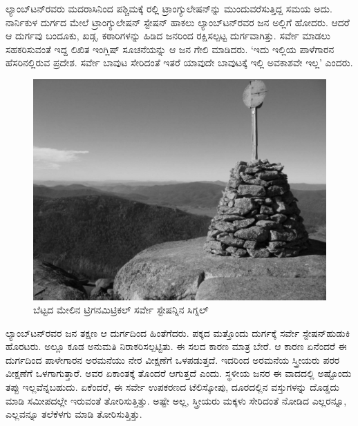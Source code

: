 \vskip 4pt

ಲ್ಯಾಂಬ್​ಟನ್​ರವರು ಮದರಾಸಿನಿಂದ ಪಶ್ಚಿಮಕ್ಕೆ ರಲ್ಲಿ ಟ್ರಾಂಗ್ಯುಲೇಷನ್​ನ್ನು ಮುಂದುವರೆಸುತ್ತಿದ್ದ ಸಮಯ ಅದು. ನಾರ್ನಿಕುಳ ದುರ್ಗದ ಮೇಲೆ ಟ್ರಾಂಗ್ಯುಲೇಷನ್​ ಸ್ಟೇಷನ್​ ಹಾಕಲು ಲ್ಯಾಂಬ್​ಟನ್​ರವರ ಜನ ಅಲ್ಲಿಗೆ ಹೋದರು. ಆದರೆ ಆ ದುರ್ಗವು ಬಂದೂಕು, ಖಡ್ಗ, ಕಠಾರಿಗಳನ್ನು ಹಿಡಿದ ಜನರಿಂದ ರಕ್ಷಿಸಲ್ಪಟ್ಟ ದುರ್ಗವಾಗಿತ್ತು. ಸರ್ವೇ ಮಾಡಲು ಸಹಕರಿಸುವಂತೆ ಇದ್ದ ಲಿಖಿತ ಇಂಗ್ಲಿಷ್​ ಸೂಚನೆಯನ್ನು ಆ ಜನ ಗೇಲಿ ಮಾಡಿದರು. ‘ಇದು ಇಲ್ಲಿಯ ಪಾಳೆಗಾರನ ಹೆಸರಿನಲ್ಲಿರುವ ಪ್ರದೇಶ. ಸರ್ವೇ ಬಾವುಟ ಸೇರಿದಂತೆ ಇತರೆ ಯಾವುದೇ ಬಾವುಟಕ್ಕೆ ಇಲ್ಲಿ ಅವಕಾಶವೇ ಇಲ್ಲ’ ಎಂದರು.

\begin{figure}[!htbp]
\includegraphics{"images/image016.jpg"}
\caption{ಬೆಟ್ಟದ ಮೇಲಿನ ಟ್ರಿಗನಮಿಟ್ರಿಕಲ್​ ಸರ್ವೇ ಸ್ಟೇಷನ್ನಿನ ಸಿಗ್ನಲ್​}\label{art12-fig1}
\end{figure}

\newpage

ಲ್ಯಾಂಬ್​ಟನ್​ರವರ ಜನ ತಕ್ಷಣ ಆ ದುರ್ಗದಿಂದ ಹಿಂತೆಗೆದರು. ಪಕ್ಕದ ಮತ್ತೊಂದು ದುರ್ಗಕ್ಕೆ ಸರ್ವೇ ಸ್ಟೇಷನ್​ ಹುಡುಕಿ ಹೊರಟರು. ಅಲ್ಲೂ ಕೂಡ ಅನುಮತಿ ನಿರಾಕರಿಸಲ್ಪಟ್ಟಿತು. ಈ ಸಲದ ಕಾರಣ ಮಾತ್ರ ಬೇರೆ. ಆ ಕಾರಣ ಏನೆಂದರೆ ಈ ದುರ್ಗದಿಂದ ಪಾಳೇಗಾರನ ಅರಮನೆಯು ನೇರ ವೀಕ್ಷಣೆಗೆ ಒಳಪಡುತ್ತದೆ. ಇದರಿಂದ ಅರಮನೆಯ ಸ್ತ್ರೀಯರು ಪರರ ವೀಕ್ಷಣೆಗೆ ಒಳಗಾಗುತ್ತಾರೆ. ಅವರ ಏಕಾಂತಕ್ಕೆ ತೊಂದರೆ ಆಗುತ್ತದೆ ಎಂದು. ಸ್ಥಳೀಯ ಜನರ ಈ ವಾದದಲ್ಲಿ ಅಷ್ಟೊಂದು ತಪ್ಪು ಇಲ್ಲವೆನ್ನಬಹುದು. ಏಕೆಂದರೆ, ಈ ಸರ್ವೇ ಉಪಕರಣದ ಟೆಲಿಸ್ಕೋಪು, ದೂರದಲ್ಲಿನ ವಸ್ತುಗಳನ್ನು ದೊಡ್ಡದು ಮಾಡಿ ಸಮೀಪದಲ್ಲೇ ಇರುವಂತೆ ತೋರಿಸುತ್ತಿತ್ತು. ಅಷ್ಟೇ ಅಲ್ಲ, ಸ್ತ್ರೀಯರು ಮಕ್ಕಳು ಸೇರಿದಂತೆ ನೋಡಿದ ಎಲ್ಲರನ್ನೂ, ಎಲ್ಲವನ್ನೂ ತಲೆಕೆಳಗು ಮಾಡಿ ತೋರಿಸುತ್ತಿತ್ತು.

